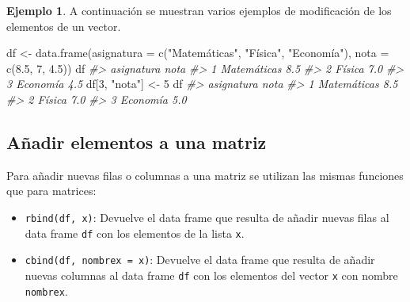 \documentclass[
]{book}
\newenvironment{Shaded}{\begin{snugshade}}{\end{snugshade}}
\newcommand{\AttributeTok}[1]{\textcolor[rgb]{0.77,0.63,0.00}{#1}}
\newcommand{\CommentTok}[1]{\textcolor[rgb]{0.56,0.35,0.01}{\textit{#1}}}
\newcommand{\DecValTok}[1]{\textcolor[rgb]{0.00,0.00,0.81}{#1}}
\newcommand{\FloatTok}[1]{\textcolor[rgb]{0.00,0.00,0.81}{#1}}
\newcommand{\FunctionTok}[1]{\textcolor[rgb]{0.00,0.00,0.00}{#1}}
\newcommand{\NormalTok}[1]{#1}
\newcommand{\OtherTok}[1]{\textcolor[rgb]{0.56,0.35,0.01}{#1}}
\newcommand{\StringTok}[1]{\textcolor[rgb]{0.31,0.60,0.02}{#1}}
\providecommand{\tightlist}{%
  \setlength{\itemsep}{0pt}\setlength{\parskip}{0pt}}
\theoremstyle{definition}
\theoremstyle{definition}
\newtheorem{example}{Ejemplo}[chapter]
\theoremstyle{definition}
\theoremstyle{definition}
\theoremstyle{remark}
\begin{document}
\begin{example}

A continuación se muestran varios ejemplos de modificación de los elementos de un vector.

\begin{Shaded}
\begin{Highlighting}[]
\NormalTok{df }\OtherTok{\textless{}{-}} \FunctionTok{data.frame}\NormalTok{(}\AttributeTok{asignatura =} \FunctionTok{c}\NormalTok{(}\StringTok{"Matemáticas"}\NormalTok{, }\StringTok{"Física"}\NormalTok{, }\StringTok{"Economía"}\NormalTok{), }\AttributeTok{nota =} \FunctionTok{c}\NormalTok{(}\FloatTok{8.5}\NormalTok{, }\DecValTok{7}\NormalTok{, }\FloatTok{4.5}\NormalTok{))}
\NormalTok{df}
\CommentTok{\#\textgreater{}    asignatura nota}
\CommentTok{\#\textgreater{} 1 Matemáticas  8.5}
\CommentTok{\#\textgreater{} 2      Física  7.0}
\CommentTok{\#\textgreater{} 3    Economía  4.5}
\NormalTok{df[}\DecValTok{3}\NormalTok{, }\StringTok{"nota"}\NormalTok{] }\OtherTok{\textless{}{-}} \DecValTok{5}
\NormalTok{df}
\CommentTok{\#\textgreater{}    asignatura nota}
\CommentTok{\#\textgreater{} 1 Matemáticas  8.5}
\CommentTok{\#\textgreater{} 2      Física  7.0}
\CommentTok{\#\textgreater{} 3    Economía  5.0}
\end{Highlighting}
\end{Shaded}

\end{example}

\hypertarget{auxf1adir-elementos-a-una-matriz-1}{%
\subsection{Añadir elementos a una matriz}\label{auxf1adir-elementos-a-una-matriz-1}}

Para añadir nuevas filas o columnas a una matriz se utilizan las mismas funciones que para matrices:

\begin{itemize}
\tightlist
\item
  \texttt{rbind(df,\ x)}: Devuelve el data frame que resulta de añadir nuevas filas al data frame \texttt{df} con los elementos de la lista \texttt{x}.
\item
  \texttt{cbind(df,\ nombrex\ =\ x)}: Devuelve el data frame que resulta de añadir nuevas columnas al data frame \texttt{df} con los elementos del vector \texttt{x} con nombre \texttt{nombrex}.
\end{itemize}
\end{document}
